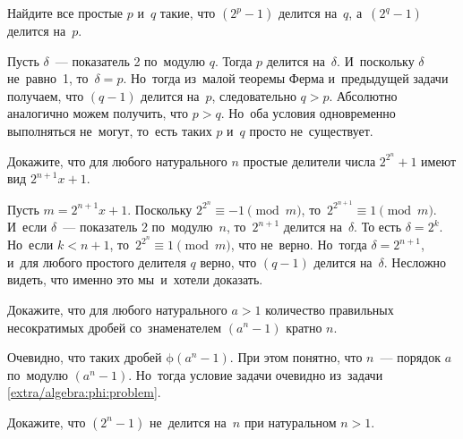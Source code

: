 \begin{problems}

\item
Найдите все простые $p$ и~$q$ такие, что $(2^p - 1)$ делится на~$q$,
а~$(2^q - 1)$ делится на~$p$.

\end{problems}

\ifincludesolutions
Пусть $\delta$~— показатель 2 по~модулю $q$.
Тогда $p$ делится на~$\delta$.
И~поскольку $\delta$ не~равно~1, то~$\delta = p$.
Но~тогда из~малой теоремы Ферма и~предыдущей задачи получаем, что $(q - 1)$
делится на~$p$, следовательно $q > p$.
Абсолютно аналогично можем получить, что $p > q$.
Но~оба условия одновременно выполняться не~могут, то~есть таких $p$ и~$q$
просто не~существует.
\fi %

\begin{problems}

\item
Докажите, что для любого натурального $n$ простые делители числа $2^{2^n} + 1$
имеют вид $2^{n+1} x + 1$.

\end{problems}

\ifincludesolutions
Пусть $m = 2^{n+1} x + 1$.
Поскольку $2^{2^n} \equiv -1 \pmod{m}$, то~$2^{2^{n+1}} \equiv 1 \pmod{m}$.
И~если $\delta$~— показатель 2 по~модулю~$n$, то~$2^{n+1}$ делится
на~$\delta$.
То есть $\delta = 2^k$.
Но~если $k < n + 1$, то~$2^{2^n} \equiv 1 \pmod{m}$, что не~верно.
Но~тогда $\delta = 2^{n+1}$, и~для любого простого делителя $q$ верно, что
$(q - 1)$ делится на~$\delta$.
Несложно видеть, что именно это мы~и~хотели доказать.
\fi %

\begin{problems}

\item
Докажите, что для любого натурального $a > 1$ количество правильных
несократимых дробей со~знаменателем $(a^n - 1)$ кратно $n$.

\end{problems}

\ifincludesolutions
Очевидно, что таких дробей $\mathrm{\phi}(a^n - 1)$.
При этом понятно, что $n$~— порядок $a$ по~модулю $(a^n - 1)$.
Но~тогда условие задачи очевидно из~задачи \ref{extra/algebra:phi:problem}.
\fi %

\begin{problems}


\item
Докажите, что $(2^n - 1)$ не~делится на~$n$ при натуральном $n > 1$.

\end{problems}


